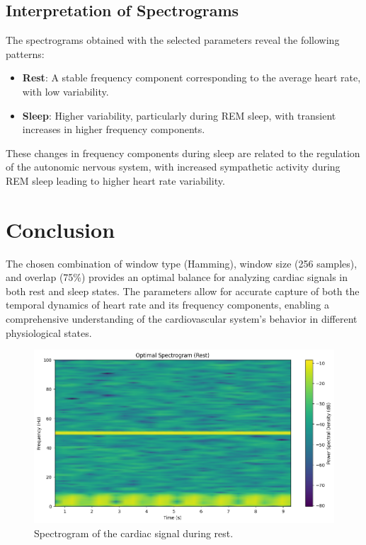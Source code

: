 \documentclass[10pt]{article}
\theoremstyle{definition}
\theoremstyle{remark}
\theoremstyle{definition}
\numberwithin{equation}{prob}
\begin{document}
\subsection{Interpretation of Spectrograms}

The spectrograms obtained with the selected parameters reveal the following patterns:
\begin{itemize}
    \item \textbf{Rest}: A stable frequency component corresponding to the average heart rate, with low variability.
    \item \textbf{Sleep}: Higher variability, particularly during REM sleep, with transient increases in higher frequency components.
\end{itemize}

These changes in frequency components during sleep are related to the regulation of the autonomic nervous system, with increased sympathetic activity during REM sleep leading to higher heart rate variability.

\section*{Conclusion}

The chosen combination of window type (Hamming), window size (256 samples), and overlap (75\%) provides an optimal balance for analyzing cardiac signals in both rest and sleep states. The parameters allow for accurate capture of both the temporal dynamics of heart rate and its frequency components, enabling a comprehensive understanding of the cardiovascular system's behavior in different physiological states.

\begin{figure}[h]
    \centering
    \includegraphics[width=0.8\linewidth]{./figures/Optimal Spectrogram Rest.png}
    \caption{Spectrogram of the cardiac signal during rest.}
\end{figure}
\end{document}
